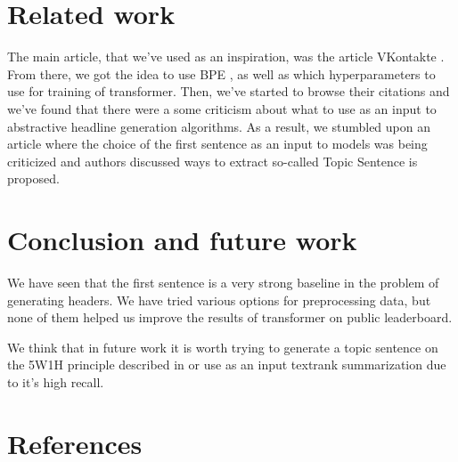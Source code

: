 \documentclass{dialogue}
\begin{document}
\section{Related work}
The main article, that we've used as an inspiration, was the article VKontakte \cite{gavrilov2018self}. From there, we got the idea to use BPE \cite{DBLP:journals/corr/SennrichHB15}, as well as which hyperparameters to use for training of transformer. Then, we've started to browse their citations and we've found that there were a some criticism about what to use as an input to abstractive headline generation algorithms. As a result, we stumbled upon an article where the choice of the first sentence as an input to models was being criticized and authors discussed ways to extract so-called Topic Sentence \cite{Putra2018IncorporatingTS} is proposed.

\section{Conclusion and future work}
We have seen that the first sentence is a very strong baseline in the problem of generating headers. We have tried various options for preprocessing data, but none of them helped us improve the results of transformer on public leaderboard.

We think that in future work it is worth trying to generate a topic sentence on the 5W1H principle described in \cite{Putra2018IncorporatingTS} or use as an input textrank summarization due to it's high recall.


\color{blue}\section*{References}

\makeatletter
\renewcommand{\section}{\@gobbletwo}
\makeatother

\end{document}

